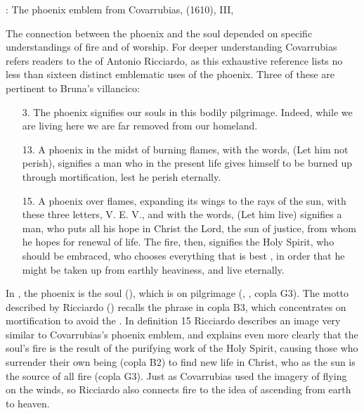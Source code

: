 
{: The phoenix emblem from Covarrubias,
 (1610),  III, }

The connection between the phoenix and the soul depended on specific
understandings of fire and of worship.
For deeper understanding Covarrubias refers readers to the  of Antonio Ricciardo, as this exhaustive reference lists no less
than sixteen distinct emblematic uses of the phoenix.
Three of these are pertinent to Bruna's villancico:
\begin{quoting}
    \begin{enumerate}
        \item[3.] The phoenix signifies our souls in this bodily pilgrimage.  
            Indeed, while we are living here we are far removed from our
            homeland.
        \item[13.] A phoenix in the midst of burning flames, with the words,
             (Let him not perish), signifies a man who in
            the present life gives himself to be burned up through 
            mortification, lest he perish eternally.
        \item[15.] A phoenix over flames, expanding its wings to the rays of
            the sun, with these three letters, V. E. V., and with the words,
             (Let him live) \Dots{} signifies a man, who puts
            all his hope in Christ the Lord, the sun of justice, from whom he
            hopes for renewal of life.  
            The fire, then, signifies the Holy Spirit, who should be embraced,
            who chooses everything that is best , in order
            that he might be taken up from earthly heaviness, and live
            eternally.%
                \Autocite[, 132--133]
                {Ricciardo:CommentariaSymbolica}
    \end{enumerate}
\end{quoting}
In , the phoenix is the soul (), which is
on pilgrimage (, , copla G3).
The motto  described by Ricciardo () recalls
the phrase  in copla B3, which concentrates on
mortification to avoid the .
In definition 15 Ricciardo describes an image very similar to Covarrubias's
phoenix emblem, and explains even more clearly that the soul's fire is the
result of the purifying work of the Holy Spirit, causing those who surrender
their own being (copla B2) to find new life in Christ, who as the sun is the
source of all fire (copla G3).
Just as Covarrubias used the imagery of flying on the winds, so Ricciardo also
connects fire to the idea of ascending from earth to heaven.

